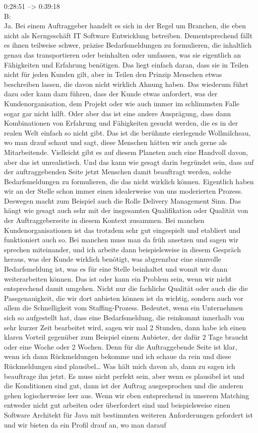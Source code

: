 0:28:51 --> 0:39:18\\
B:\\
Ja. Bei einem Auftraggeber handelt es sich in der Regel um Branchen, die eben nicht als Kerngeschäft IT Software Entwicklung betreiben. Dementsprechend fällt es ihnen teilweise schwer, präzise Bedarfsmeldungen zu formulieren, die inhaltlich genau das transportieren oder beinhalten oder umfassen, was sie eigentlich an Fähigkeiten und Erfahrung benötigen. Das liegt einfach daran, dass sie in Teilen nicht für jeden Kunden gilt, aber in Teilen den Prinzip Menschen etwas beschreiben lassen, die davon nicht wirklich Ahnung haben. Das wiederum führt dazu oder kann dazu führen, dass der Kunde etwas anfordert, was der Kundenorganisation, dem Projekt oder wie auch immer im schlimmsten Falle sogar gar nicht hilft. Oder aber das ist eine andere Ausprägung, dass dann Kombinationen von Erfahrung und Fähigkeiten gesucht werden, die es in der realen Welt einfach so nicht gibt. Das ist die berühmte eierlegende Wollmilchsau, wo man drauf schaut und sagt, diese Menschen hätten wir auch gerne als Mitarbeitende. Vielleicht gibt es auf diesem Planeten auch eine Handvoll davon, aber das ist unrealistisch. Und das kann wie gesagt darin begründet sein, dass auf der auftraggebenden Seite jetzt Menschen damit beauftragt werden, solche Bedarfsmeldungen zu formulieren, die das nicht wirklich können. Eigentlich haben wir an der Stelle schon immer einen idealerweise von uns moderierten Prozess. Deswegen macht zum Beispiel auch die Rolle Delivery Management Sinn. Das hängt wie gesagt auch sehr mit der insgesamten Qualifikation oder Qualität von der Auftraggeberseite in diesem Kontext zusammen. Bei manchen Kundenorganisationen ist das trotzdem sehr gut eingespielt und etabliert und funktioniert auch so. Bei manchen muss man da früh ansetzen und sagen wir sprechen miteinander, und ich arbeite dann beispielsweise in diesem Gespräch heraus, was der Kunde wirklich benötigt, was abgrenzbar eine sinnvolle Bedarfsmeldung ist, was es für eine Stelle beinhaltet und womit wir dann weiterarbeiten können. Das ist oder kann ein Problem sein, wenn wir nicht entsprechend damit umgehen. Nicht nur die fachliche Qualität oder auch die die Passgenauigkeit, die wir dort anbieten können ist da wichtig, sondern auch vor allem die Schnelligkeit vom Staffing-Prozess. Bedeutet, wenn ein Unternehmen sich so aufgestellt hat, dass eine Bedarfsmeldung, die reinkommt innerhalb von sehr kurzer Zeit bearbeitet wird, sagen wir mal 2 Stunden, dann habe ich einen klaren Vorteil gegenüber zum Beispiel einem Anbieter, der dafür 2 Tage braucht oder eine Woche oder 2 Wochen. Denn für die Auftraggebende Seite ist klar, wenn ich dann Rückmeldungen bekomme und ich schaue da rein und diese Rückmeldungen sind plausibel… Was hält mich davon ab, dann zu sagen ich beauftrage ihn jetzt. Es muss nicht perfekt sein, aber wenn es plausibel ist und die Konditionen sind gut, dann ist der Auftrag ausgesprochen und die anderen gehen logischerweise leer aus. Wenn wir eben entsprechend in unserem Matching entweder nicht gut arbeiten oder überfordert sind und beispielsweise einen Software Architekt für Java mit bestimmten weiteren Anforderungen gefordert ist und wir bieten da ein Profil drauf an, wo man darauf 